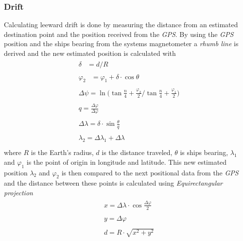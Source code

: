 \subsubsection{Drift}
Calculating leeward drift is done by measuring the distance from an estimated destination point and the position received from the \textit{GPS}. By using the \textit{GPS} position and the ships bearing from the systems magnetometer a \textit{rhumb line}\cite{rhumb-line} is derived and the new estimated position is calculated with
\begin{align*}
  &\begin{aligned}
  \delta &= d/R 
  \end{aligned}\\
 &\begin{aligned}
  \varphi_2 &= \varphi_1 + \delta \cdot \cos{\theta}
  \end{aligned}\\
 &\begin{aligned}
  \Delta\psi = \ln { \bigg( \tan{\frac{n}{4} + \frac{\varphi_2}{2}} \bigg/ \tan{\frac{n}{4} + \frac{\varphi_1}{2}} \bigg)}
  \end{aligned}\\
 &\begin{aligned}
  q = \frac{\Delta\varphi}{\Delta\varphi}
  \end{aligned}\\
 &\begin{aligned}
  \Delta\lambda = \delta\cdot\sin\frac{\theta}{q}
  \end{aligned}\\
 &\begin{aligned}
  \lambda_2 = \Delta\lambda_1 + \Delta\lambda
  \end{aligned}\\
\end{align*}
where $R$ is the Earth's radius, $d$ is the distance traveled, $\theta$ is ships bearing, $\lambda_1$ and $\varphi_1$ is the point of origin in longitude and latitude. This new estimated position $\lambda_2$ and $\varphi_2$ is then compared to the next positional data from the \textit{GPS} and the distance between these points is calculated using \textit{Equirectangular projection}\cite{equirectangular}
\begin{align*}
  &\begin{aligned}
  x = \Delta\lambda \cdot \cos\frac{\Delta\varphi}{2}
  \end{aligned}\\
 &\begin{aligned}
  y = \Delta\varphi
  \end{aligned}\\
 &\begin{aligned}
  d = R\cdot\sqrt{x^2+y^2}
  \end{aligned}\\
\end{align*}
